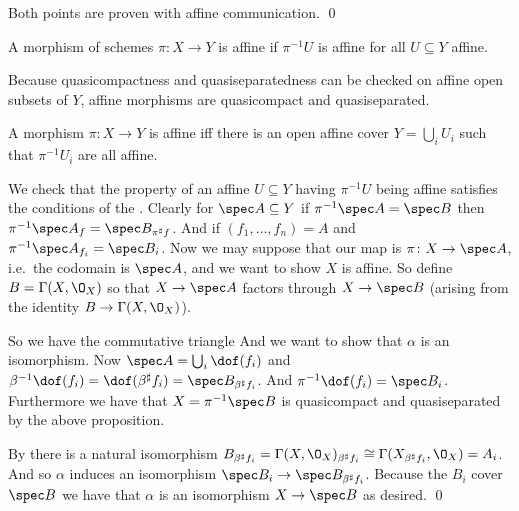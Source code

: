 \eprop

\bproof

    Both points are proven with affine communication.
    \qed

\eproof

\bdefn

    A morphism of schemes $\pi\colon X\to Y$ is {\emphcolor affine} if $\pi^{-1}U$ is affine for all $U\subseteq Y$ affine.

\edefn

Because quasicompactness and quasiseparatedness can be checked on affine open subsets of $Y$, affine morphisms are quasicompact and
quasiseparated.

\bprop

    A morphism $\pi\colon X\to Y$ is affine iff there is an open affine cover $Y=\bigcup_iU_i$ such that $\pi^{-1}U_i$ are all affine.

\eprop

\bproof

    We check that the property of an affine $U\subseteq Y$ having $\pi^{-1}U$ being affine satisfies the conditions of the
    .
    Clearly for $\spec A\subseteq Y$ if $\pi^{-1}\spec A=\spec B$ then $\pi^{-1}\spec A_f=\spec B_{\pi^\sharp f}$.
    And if $(f_1,\dots,f_n)=A$ and $\pi^{-1}\spec A_{f_i}=\spec B_i$.
    Now we may suppose that our map is $\pi\colon X\to\spec A$, i.e.\ the codomain is $\spec A$, and we want to show $X$ is affine.
    So define $B=\Gamma(X,\O_X)$ so that $X\to\spec A$ factors through $X\to\spec B$ (arising from the identity $B\to\Gamma(X,\O_X)$).

    So we have the commutative triangle
    And we want to show that $\alpha$ is an isomorphism.
    Now $\spec A=\bigcup_i\dof(f_i)$ and $\beta^{-1}\dof(f_i)=\dof(\beta^\sharp f_i)=\spec B_{\beta^\sharp f_i}$.
    And $\pi^{-1}\dof(f_i)=\spec B_i$.
    Furthermore we have that $X=\pi^{-1}\spec B$ is quasicompact and quasiseparated by the above proposition.

    By  there is a natural isomorphism $B_{\beta^\sharp f_i}=\Gamma(X,\O_X)_{\beta^\sharp f_i}\cong\Gamma(X_{\beta^\sharp f_i},\O_X)=A_i$.
    And so $\alpha$ induces an isomorphism $\spec B_i\to\spec B_{\beta^\sharp f_i}$.
    Because the $B_i$ cover $\spec B$ we have that $\alpha$ is an isomorphism $X\to\spec B$ as desired.
    \qed

